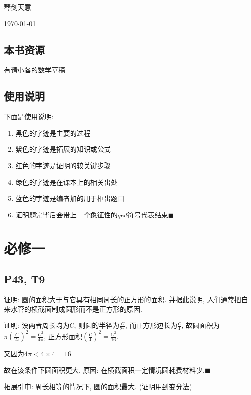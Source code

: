 \documentclass{book}
\begin{document}
    {\hfill 琴剑天意}

    {\hfill \today}

    \section{本书资源}
    有请小各的数学草稿\dots\dots
    \section{使用说明}

    下面是使用说明: 
    \begin{enumerate}
        \item 黑色的字迹是主要的过程
        \item \textcolor[rgb]{0.38,0.11,0.2}{紫色的字迹是拓展的知识或公式}
        \item \textcolor[rgb]{0.75,0.17,0.22}{红色的字迹是证明的较关键步骤}
        \item \textcolor[rgb]{0.11,0.65,0.52}{绿色的字迹是在课本上的相关出处}
        \item \textcolor[rgb]{0.13,0.47,0.72}{蓝色的字迹是编者加的用于框出题目}
        \item 证明题完毕后会带上一个象征性的$qed$符号代表结束$\blacksquare$
    \end{enumerate}
    \chapter{必修一}
    \section{\textcolor[rgb]{0.11,0.65,0.52}{P43, T9}}
    \begin{boxB}
        证明: 圆的面积大于与它具有相同周长的正方形的面积. 并据此说明, 人们通常把自来水管的横截面制成圆形而不是正方形的原因.
    \end{boxB}
    \doublespacing
    证明: 设两者周长均为$C$, 则圆的半径为$\displaystyle \frac{C}{2\pi}$, 而正方形边长为$\displaystyle \frac{C}{4}$, 故圆面积为$\displaystyle \pi(\frac{C}{2\pi})^2=\frac{C^2}{4\pi}$, 正方形面积$\displaystyle (\frac{C}{4})^2=\frac{C^2}{16}$.

    又因为$\displaystyle 4\pi < 4 \times 4 = 16$

    故在该条件下圆面积更大, 原因: 在横截面积一定情况圆耗费材料少.$\blacksquare$

    \textcolor[rgb]{0.38,0.11,0.2}{拓展引申: 周长相等的情况下, 圆的面积最大. (证明用到变分法)}
\end{document}
